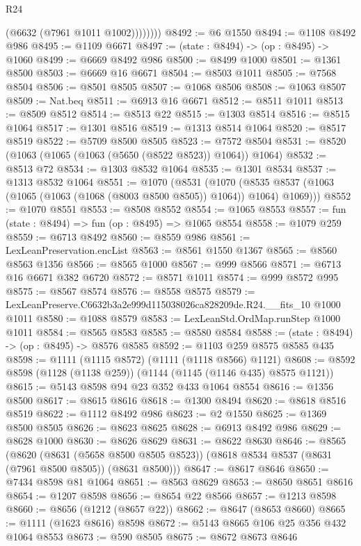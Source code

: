 \begin{lexlean}{R24}
\begin{coremodule}
                (@6632 (@7961 @1011 @1002))))))))
@8492 := @6 @1550
@8494 := @1108 @8492 @986
@8495 := @1109 @6671
@8497 := (state : @8494) -> (op : @8495) -> @1060
@8499 := @6669 @8492 @986
@8500 := @8499 @1000
@8501 := @1361 @8500
@8503 := @6669 @16 @6671
@8504 := @8503 @1011
@8505 := @7568 @8504
@8506 := @8501 @8505
@8507 := @1068 @8506
@8508 := @1063 @8507
@8509 := Nat.beq
@8511 := @6913 @16 @6671
@8512 := @8511 @1011
@8513 := @8509 @8512
@8514 := @8513 @22
@8515 := @1303 @8514
@8516 := @8515 @1064
@8517 := @1301 @8516
@8519 := @1313 @8514 @1064
@8520 := @8517 @8519
@8522 := @5709 @8500 @8505
@8523 := @7572 @8504
@8531 := @8520 (@1063 (@1065 (@1063 (@5650 (@8522 @8523)) @1064)) @1064)
@8532 := @8513 @72
@8534 := @1303 @8532 @1064
@8535 := @1301 @8534
@8537 := @1313 @8532 @1064
@8551 := @1070
    (@8531
      (@1070 (@8535 @8537 (@1063 (@1065 (@1063 (@1068 (@8003 @8500 @8505)) @1064)) @1064) @1069)))
@8552 := @1070 @8551
@8553 := @8508 @8552
@8554 := @1065 @8553
@8557 := fun (state : @8494) => fun (op : @8495) => @1065 @8554
@8558 := @1079 @259
@8559 := @6713 @8492
@8560 := @8559 @986
@8561 := LexLeanPreservation.encList
@8563 := @8561 @1550 @1367
@8565 := @8560 @8563 @1356
@8566 := @8565 @1000
@8567 := @999 @8566
@8571 := @6713 @16 @6671 @382 @6720
@8572 := @8571 @1011
@8574 := @999 @8572 @995
@8575 := @8567 @8574
@8576 := @8558 @8575
@8579 := LexLeanPreserve.C6632b3a2e999d115038026ca828209de.R24.__fits_10 @1000 @1011
@8580 := @1088 @8579
@8583 := LexLeanStd.OrdMap.runStep @1000 @1011
@8584 := @8565 @8583
@8585 := @8580 @8584
@8588 := (state : @8494) -> (op : @8495) -> @8576 @8585
@8592 := @1103 @259 @8575 @8585 @435
@8598 := @1111 (@1115 @8572) (@1111 (@1118 @8566) @1121)
@8608 := @8592 @8598 (@1128 (@1138 @259)) (@1144 (@1145 (@1146 @435) @8575 @1121))
@8615 := @5143 @8598 @94 @23 @352 @433 @1064 @8554
@8616 := @1356 @8500
@8617 := @8615 @8616
@8618 := @1300 @8494
@8620 := @8618 @8516 @8519
@8622 := @1112 @8492 @986
@8623 := @2 @1550
@8625 := @1369 @8500 @8505
@8626 := @8623 @8625
@8628 := @6913 @8492 @986
@8629 := @8628 @1000
@8630 := @8626 @8629
@8631 := @8622 @8630
@8646 := @8565
    (@8620
      (@8631 (@5658 @8500 @8505 @8523))
      (@8618 @8534 @8537 (@8631 (@7961 @8500 @8505)) (@8631 @8500)))
@8647 := @8617 @8646
@8650 := @7434 @8598 @81 @1064
@8651 := @8563 @8629
@8653 := @8650 @8651 @8616
@8654 := @1207 @8598
@8656 := @8654 @22 @8566
@8657 := @1213 @8598
@8660 := @8656 (@1212 (@8657 @22))
@8662 := @8647 (@8653 @8660)
@8665 := @1111 (@1623 @8616) @8598
@8672 := @5143 @8665 @106 @25 @356 @432 @1064 @8553
@8673 := @590 @8505
@8675 := @8672 @8673 @8646

\end{coremodule}
\end{lexlean}
